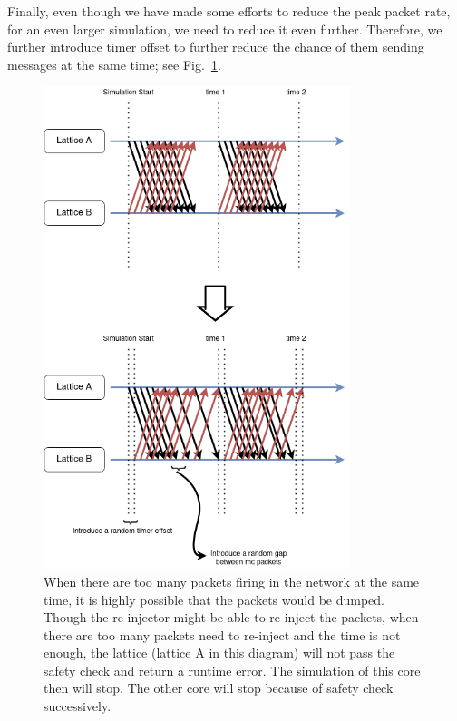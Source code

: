 Finally, even though we have made some efforts to reduce the peak packet rate, for an even larger simulation, we need to reduce it even further. Therefore, we further introduce timer offset to further reduce the chance of them sending messages at the same time; see Fig.~\ref{fig:packet_offset}.\\

\begin{figure}[!tb]
   \centering
       \includegraphics[width=0.8\textwidth]{figures/optimize.png}
       \caption{When there are too many packets firing in the network at the same time, it is highly possible that the packets would be dumped. Though the re-injector might be able to re-inject the packets, when there are too many packets need to re-inject and the time is not enough, the lattice (lattice A in this diagram) will not pass the safety check and return a runtime error. The simulation of this core then will stop. The other core will stop because of safety check successively.}
       \label{fig:packet_offset}
\end{figure}

